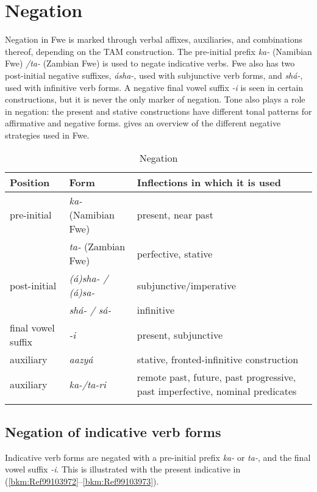 \chapter{Negation}
\label{bkm:Ref100140375}\label{bkm:Ref98752806}\label{bkm:Ref97905708}\hypertarget{Toc75352706}{}
Negation in Fwe is marked through verbal affixes, auxiliaries, and combinations thereof, depending on the TAM construction. The pre-initial prefix \textit{ka-} (Namibian Fwe) \textit{/ta-} (Zambian Fwe) is used to negate indicative verbs. Fwe also has two post-initial negative suffixes, \textit{ásha-}, used with subjunctive verb forms, and \textit{shá-}, used with infinitive verb forms. A negative final vowel suffix \textit{-i} is seen in certain constructions, but it is never the only marker of negation. Tone also plays a role in negation: the present and stative constructions have different tonal patterns for affirmative and negative forms.  gives an overview of the different negative strategies used in Fwe.

\begin{table}
\label{bkm:Ref489278666}\caption{\label{tab:12:1}Negation}

\begin{tabularx}{\textwidth}{llQ}
\lsptoprule
Position & Form & Inflections in which it is used\\
\midrule
pre-initial & \textit{ka-} (Namibian Fwe) & present, near past \\
            & \textit{ta-} (Zambian Fwe) & perfective, stative\\
post-initial & \textit{(á)sha- / (á)sa-} & subjunctive/imperative\\
             & \textit{shá- / sá-}  & infinitive\\
final vowel suffix & {\itshape -i} & present, subjunctive\\
auxiliary & {\itshape aazyá} & stative, fronted-infinitive construction\\
auxiliary & {\itshape ka-/ta-ri} & remote past, future, past progressive, past imperfective, nominal predicates\\
\lspbottomrule
\end{tabularx}
\end{table}
\section{Negation of indicative verb forms}
\label{bkm:Ref490843739}\hypertarget{Toc75352707}{}
Indicative verb forms are negated with a pre-initial prefix \textit{ka-} or \textit{ta-}, and the final vowel suffix \textit{-i}. This is illustrated with the present indicative in (\ref{bkm:Ref99103972}--\ref{bkm:Ref99103973}).

